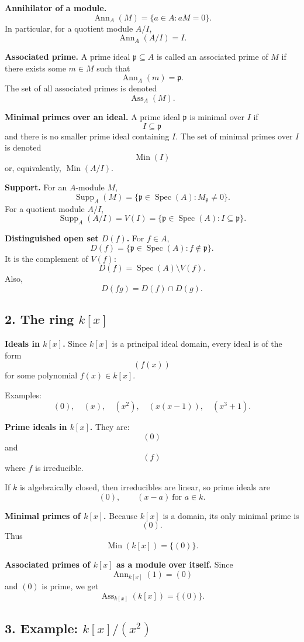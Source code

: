 \documentclass[12pt,a4paper]{article}
\theoremstyle{notespace}
\DeclareMathOperator{\Spec}{Spec}
\DeclareMathOperator{\Ass}{Ass}
\DeclareMathOperator{\Ann}{Ann}
\DeclareMathOperator{\Supp}{Supp}
\DeclareMathOperator{\Min}{Min}
\begin{document}
\textbf{Annihilator of a module.}
\[
\Ann_A(M)=\{a\in A:aM=0\}.
\]
In particular, for a quotient module \(A/I\),
\[
\Ann_A(A/I)=I.
\]

\textbf{Associated prime.}
A prime ideal \(\mathfrak p\subseteq A\) is called an associated prime of \(M\) if there exists some \(m\in M\) such that
\[
\Ann_A(m)=\mathfrak p.
\]
The set of all associated primes is denoted
\[
\Ass_A(M).
\]

\textbf{Minimal primes over an ideal.}
A prime ideal \(\mathfrak p\) is minimal over \(I\) if
\[
I\subseteq \mathfrak p
\]
and there is no smaller prime ideal containing \(I\).
The set of minimal primes over \(I\) is denoted
\[
\Min(I)
\]
or, equivalently, \(\Min(A/I)\).

\textbf{Support.}
For an \(A\)-module \(M\),
\[
\Supp_A(M)=\{\mathfrak p\in \Spec(A):M_{\mathfrak p}\neq 0\}.
\]
For a quotient module \(A/I\),
\[
\Supp_A(A/I)=V(I)=\{\mathfrak p\in \Spec(A):I\subseteq \mathfrak p\}.
\]

\textbf{Distinguished open set \(D(f)\).}
For \(f\in A\),
\[
D(f)=\{\mathfrak p\in \Spec(A):f\notin \mathfrak p\}.
\]
It is the complement of \(V(f)\):
\[
D(f)=\Spec(A)\setminus V(f).
\]
Also,
\[
D(fg)=D(f)\cap D(g).
\]

\subsection*{2. The ring \(k[x]\)}

\textbf{Ideals in \(k[x]\).}
Since \(k[x]\) is a principal ideal domain, every ideal is of the form
\[
(f(x))
\]
for some polynomial \(f(x)\in k[x]\).

Examples:
\[
(0),\quad (x),\quad (x^2),\quad (x(x-1)),\quad (x^3+1).
\]

\textbf{Prime ideals in \(k[x]\).}
They are:
\[
(0)
\]
and
\[
(f)
\]
where \(f\) is irreducible.

If \(k\) is algebraically closed, then irreducibles are linear, so prime ideals are
\[
(0),\qquad (x-a)\ \text{for } a\in k.
\]

\textbf{Minimal primes of \(k[x]\).}
Because \(k[x]\) is a domain, its only minimal prime is
\[
(0).
\]
Thus
\[
\Min(k[x])=\{(0)\}.
\]

\textbf{Associated primes of \(k[x]\) as a module over itself.}
Since
\[
\Ann_{k[x]}(1)=(0)
\]
and \((0)\) is prime, we get
\[
\Ass_{k[x]}(k[x])=\{(0)\}.
\]

\subsection*{3. Example: \(k[x]/(x^2)\)}
\end{document}
